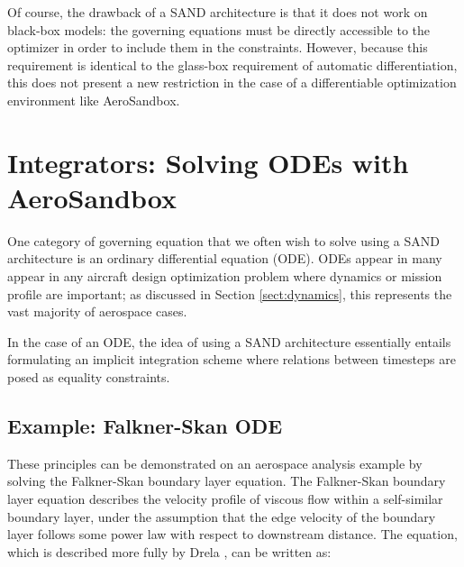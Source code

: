 Of course, the drawback of a SAND architecture is that it does not work on black-box models: the governing equations must be directly accessible to the optimizer in order to include them in the constraints. However, because this requirement is identical to the glass-box requirement of automatic differentiation, this does not present a new restriction in the case of a differentiable optimization environment like AeroSandbox.



\section{Integrators: Solving ODEs with AeroSandbox}
\label{sect:integrators}

One category of governing equation that we often wish to solve using a SAND architecture is an ordinary differential equation (ODE). ODEs appear in many appear in any aircraft design optimization problem where dynamics or mission profile are important; as discussed in Section \ref{sect:dynamics}, this represents the vast majority of aerospace cases.

In the case of an ODE, the idea of using a SAND architecture essentially entails formulating an implicit integration scheme where relations between timesteps are posed as equality constraints.



\subsection{Example: Falkner-Skan ODE}

These principles can be demonstrated on an aerospace analysis example by solving the Falkner-Skan boundary layer equation. The Falkner-Skan boundary layer equation describes the velocity profile of viscous flow within a self-similar boundary layer, under the assumption that the edge velocity of the boundary layer follows some power law with respect to downstream distance. The equation, which is described more fully by Drela \cite{avf}, can be written as:

